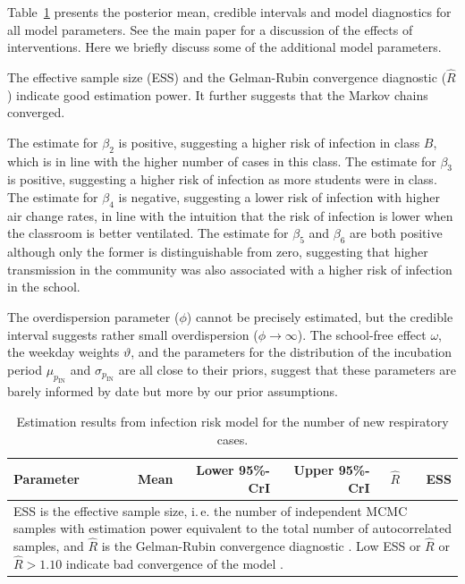 \documentclass[fleqn,11pt]{wlscirep_supp}
\newcommand\ie{i.\,e.\xspace}
\begin{document}
Table~\ref{tab:estimation-results} presents the posterior mean, credible intervals and model diagnostics for all model parameters. See the main paper for a discussion of the effects of interventions. Here we briefly discuss some of the additional model parameters.

The effective sample size (ESS) and the Gelman-Rubin convergence diagnostic ($\hat{R}$) indicate good estimation power. It further suggests that the Markov chains converged. 

The estimate for $\beta_2$ is positive, suggesting a higher risk of infection in class $B$, which is in line with the higher number of cases in this class. The estimate for $\beta_3$ is positive, suggesting a higher risk of infection as more students were in class. The estimate for $\beta_4$ is negative, suggesting a lower risk of infection with higher air change rates, in line with the intuition that the risk of infection is lower when the classroom is better ventilated. The estimate for $\beta_5$ and $\beta_6$ are both positive although only the former is distinguishable from zero, suggesting that higher transmission in the community was also associated with a higher risk of infection in the school. 

The overdispersion parameter ($\phi$) cannot be precisely estimated, but the credible interval suggests rather small overdispersion ($\phi \rightarrow \infty$). The school-free effect $\omega$, the weekday weights $\vartheta$, and the parameters for the distribution of the incubation period $\mu_{p_{\text{IN}}}$ and $\sigma_{p_{\text{IN}}}$ are all close to their priors, suggest that these parameters are barely informed by date but more by our prior assumptions.

\begin{table}[!htpb]
    \caption[Estimation results from infection risk model]{Estimation results from infection risk model for the number of new respiratory cases.}
    \label{tab:estimation-results}
    \footnotesize
    \centering
    \begin{tabular}{lrrrrr}
    \toprule
    Parameter & Mean & Lower 95\%-CrI & Upper 95\%-CrI & $\hat{R}$ & ESS \\
    \midrule
    
    \bottomrule
    \multicolumn{6}{p{13cm}}{\scriptsize
        ESS is the effective sample size, \ie the number of independent MCMC samples with estimation power equivalent to the total number of autocorrelated samples\cite{Stan2022}, and $\hat{R}$ is the Gelman-Rubin convergence diagnostic \cite{Gelman1992}. Low ESS or $\hat{R}$ or $\hat{R}>1.10$ indicate bad convergence of the model \cite{Gelman2013}.}
    \end{tabular}
\end{table}
\end{document}
